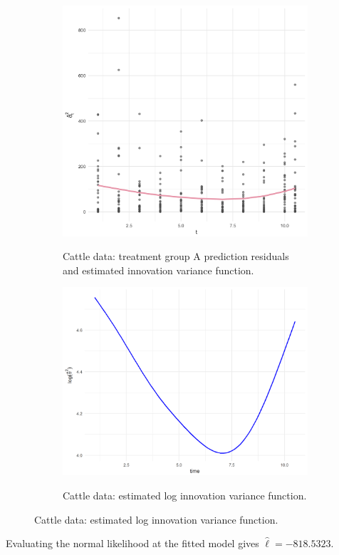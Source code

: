 \documentclass[12pt]{article}
\theoremstyle{definition}
\begin{document}
\begin{figure}[H] \label{fig:cattle-cholesky-components}
  \begin{subfigure}[t]{0.45\textwidth}
\centering
\includegraphics[width = \textwidth]{img/cattle/fitted-innovation-variance-function-cattleA}
\label{fig:cattleA-sig2-fit}
\caption{Cattle data: treatment group A prediction residuals and estimated innovation variance function.}
\end{subfigure}
\hfill
\begin{subfigure}[t]{0.45\textwidth}
\centering
\includegraphics[width = \textwidth]{img/cattle/fitted-log-innovation-variance-function-cattleA}
\label{fig:cattleA-log-sig2-fit}
\caption{Cattle data: estimated log innovation variance function.}
\end{subfigure} 
\end{figure}

Evaluating the normal likelihood at the fitted model gives $\hat{\ell} = -818.5323$.
\end{document}

